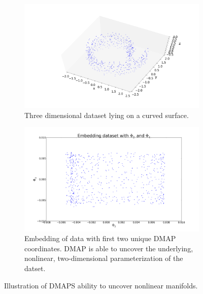 \documentclass[11pt]{article}
\begin{document}
\begin{figure}[!h]
  \begin{subfigure}{.5\textwidth}
    \begin{center}
      \includegraphics[width=1.0\textwidth]{dmaps_dataset}
      \caption{Three dimensional dataset lying on a curved surface.}
      \label{fig:swissroll}
    \end{center}
  \end{subfigure}
  \begin{subfigure}{.5\textwidth}
    \begin{center}
      \includegraphics[width=1.0\textwidth]{dmaps_embedding}
      \caption{Embedding of data with first two unique DMAP coordinates. DMAP is able to uncover the underlying, nonlinear, two-dimensional parameterization of the datset.}
      \label{fig:swissroll:embedding}
    \end{center}
  \end{subfigure}
  \caption{Illustration of DMAPS ability to uncover nonlinear manifolds.}
\end{figure}
\end{document}
